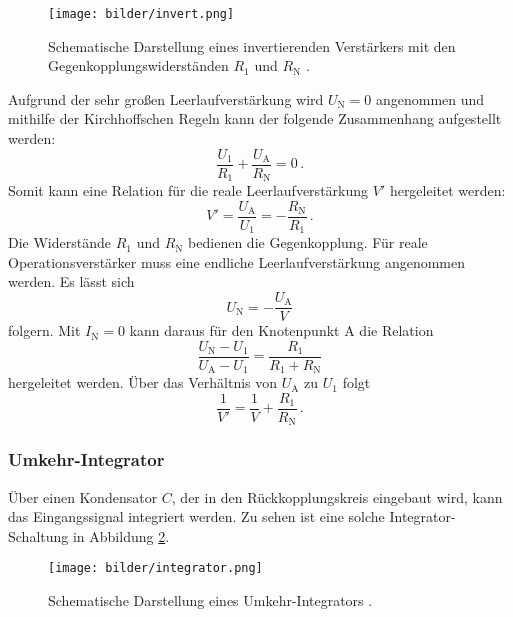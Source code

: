   \begin{figure}[H]
    \centering
    \texttt{[image: bilder/invert.png]}
    \caption{Schematische Darstellung eines invertierenden Verstärkers mit den Gegenkopplungswiderständen $R_1$ und $R_\text{N}$ \cite{anleitung}.}
    \label{invert}
  \end{figure}

Aufgrund der sehr großen Leerlaufverstärkung wird $U_\text{N}=0$ angenommen und mithilfe der Kirchhoffschen Regeln kann der folgende Zusammenhang aufgestellt werden:
\begin{equation}
  \frac{U_1}{R_1}+\frac{U_\text{A}}{R_\text{N}}=0\,.
\end{equation}
  Somit kann eine Relation für die reale Leerlaufverstärkung $V'$ hergeleitet werden:
  \begin{equation}
    V'=\frac{U_\text{A}}{U_\text{1}}=-\frac{R_\text{N}}{R_1}\,.
    \label{eq:V_linear}
  \end{equation}
  Die Widerstände $R_1$ und $R_\text{N}$ bedienen die Gegenkopplung. Für reale Operationsverstärker muss eine endliche Leerlaufverstärkung angenommen werden. Es lässt sich
  \begin{equation}
    U_\text{N}=-\frac{U_\text{A}}{V}
  \end{equation}
  folgern.
  Mit $I_\text{N}=0$ kann daraus für den Knotenpunkt A die Relation
  \begin{equation}
    \frac{U_\text{N}-U_1}{U_\text{A}-U_1}=\frac{R_1}{R_1+R_\text{N}}
  \end{equation}
  hergeleitet werden. Über das Verhältnis von $U_\text{A}$ zu $U_1$ folgt
  \begin{equation}
    \frac{1}{V'}=\frac{1}{V}+\frac{R_1}{R_\text{N}}\,.
  \end{equation}
\subsubsection{Umkehr-Integrator}
Über einen Kondensator $C$, der in den Rückkopplungskreis eingebaut wird, kann das Eingangssignal integriert werden. Zu sehen ist eine solche Integrator-Schaltung in Abbildung \ref{integrator}.

\begin{figure}[H]
  \centering
  \texttt{[image: bilder/integrator.png]}
  \caption{Schematische Darstellung eines Umkehr-Integrators \cite{anleitung}.}
  \label{integrator}
\end{figure}

